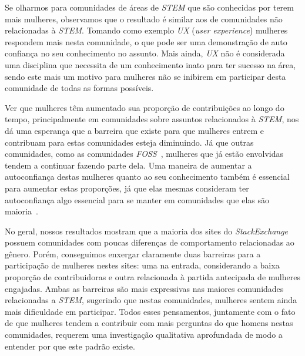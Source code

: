 Se olharmos para comunidades de áreas de \emph{STEM} que são conhecidas por terem mais mulheres, observamos que o resultado é similar aos de comunidades não relacionadas à \emph{STEM}. Tomando como exemplo \emph{UX} (\textit{user experience}) mulheres respondem mais nesta comunidade, o que pode ser uma demonstração de auto confiança no seu conhecimento no assunto. Mais ainda, \emph{UX} não é considerada uma disciplina que necessita de um conhecimento inato para ter sucesso na área, sendo este mais um motivo para mulheres não se inibirem em participar desta comunidade de todas as formas possíveis. 

Ver que mulheres têm aumentado sua proporção de contribuições ao longo do tempo, principalmente em comunidades sobre assuntos relacionados à \emph{STEM}, nos dá uma esperança que a barreira que existe para que mulheres entrem e contribuam para estas comunidades esteja diminuindo. Já que outras comunidades, como as comunidades \emph{FOSS}~\cite{powell2010gender}, mulheres que já estão envolvidas tendem a continuar fazendo parte dela. Uma maneira de aumentar a autoconfiança destas mulheres quanto ao seu conhecimento também é essencial para aumentar estas proporções, já que elas mesmas consideram ter autoconfiança algo essencial para se manter em comunidades que elas são maioria~\cite{powell2010gender}.


No geral, nossos resultados mostram que a maioria dos sites do \emph{StackExchange} possuem comunidades com poucas diferenças de comportamento relacionadas ao gênero. Porém, conseguimos enxergar claramente duas barreiras para a participação de mulheres nestes sites: uma na entrada, considerando a baixa proporção de contribuidoras e outra relacionada à partida antecipada de mulheres engajadas. Ambas as barreiras são mais expressivas nas maiores comunidades relacionadas a \emph{STEM}, sugerindo que nestas comunidades, mulheres sentem ainda mais dificuldade em participar. Todos esses pensamentos, juntamente com o fato de que mulheres tendem a contribuir com mais perguntas do que homens nestas comunidades, requerem uma investigação qualitativa aprofundada de modo a entender por que este padrão existe.


